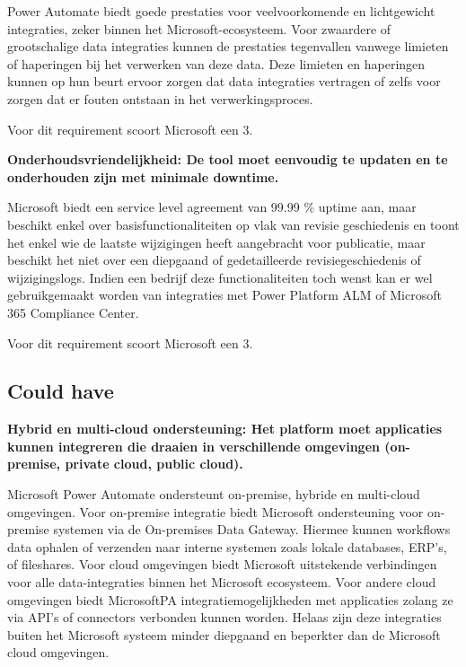 Power Automate biedt goede prestaties voor veelvoorkomende en lichtgewicht integraties, zeker binnen het Microsoft-ecosysteem. Voor zwaardere of grootschalige data integraties kunnen de prestaties tegenvallen vanwege limieten of haperingen bij het verwerken van deze data. Deze limieten en haperingen kunnen op hun beurt ervoor zorgen dat data integraties vertragen of zelfs voor zorgen dat er fouten ontstaan in het verwerkingsproces.

Voor dit requirement scoort Microsoft een 3.

\vspace{\baselineskip}

\textbf{Onderhoudsvriendelijkheid: De tool moet eenvoudig te updaten en te onderhouden zijn met minimale downtime.}

\vspace{\baselineskip}

Microsoft biedt een service level agreement van 99.99 \% uptime aan, maar beschikt enkel over basisfunctionaliteiten op vlak van revisie geschiedenis en toont het enkel wie de laatste wijzigingen heeft aangebracht voor publicatie, maar beschikt het niet over een diepgaand of gedetailleerde revisiegeschiedenis of wijzigingslogs. Indien een bedrijf deze functionaliteiten toch wenst kan er wel gebruikgemaakt worden van integraties met Power Platform ALM of Microsoft 365 Compliance Center.


Voor dit requirement scoort Microsoft een 3.

\vspace{\baselineskip}

\subsection{Could have}%
\label{CouldHaveMicrosoft}

\textbf{Hybrid en multi-cloud ondersteuning: Het platform moet applicaties kunnen integreren die draaien in verschillende omgevingen (on-premise, private cloud, public cloud).}

\vspace{\baselineskip}

Microsoft Power Automate ondersteunt on-premise, hybride en multi-cloud omgevingen. Voor on-premise integratie biedt Microsoft ondersteuning voor on-premise systemen via de On-premises Data Gateway. Hiermee kunnen workflows data ophalen of verzenden naar interne systemen zoals lokale databases, ERP’s, of fileshares. Voor cloud omgevingen biedt Microsoft uitstekende verbindingen voor alle data-integraties binnen het Microsoft ecosysteem. Voor andere cloud omgevingen biedt MicrosoftPA integratiemogelijkheden met applicaties zolang ze via API’s of connectors verbonden kunnen worden. Helaas zijn deze integraties buiten het Microsoft systeem minder diepgaand en beperkter dan de Microsoft cloud omgevingen. 


